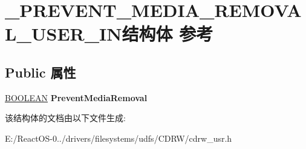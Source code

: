 \hypertarget{struct___p_r_e_v_e_n_t___m_e_d_i_a___r_e_m_o_v_a_l___u_s_e_r___i_n}{}\section{\+\_\+\+P\+R\+E\+V\+E\+N\+T\+\_\+\+M\+E\+D\+I\+A\+\_\+\+R\+E\+M\+O\+V\+A\+L\+\_\+\+U\+S\+E\+R\+\_\+\+I\+N结构体 参考}
\label{struct___p_r_e_v_e_n_t___m_e_d_i_a___r_e_m_o_v_a_l___u_s_e_r___i_n}
\subsection*{Public 属性}
\begin{DoxyCompactItemize}
\item 
\mbox{\label{struct___p_r_e_v_e_n_t___m_e_d_i_a___r_e_m_o_v_a_l___u_s_e_r___i_n_ad6d98dcdcebd6589b00c32a1b9b58669}} 
\hyperlink{_processor_bind_8h_a112e3146cb38b6ee95e64d85842e380a}{B\+O\+O\+L\+E\+AN} {\bfseries Prevent\+Media\+Removal}
\end{DoxyCompactItemize}


该结构体的文档由以下文件生成\+:\begin{DoxyCompactItemize}
\item 
E\+:/\+React\+O\+S-\/0../drivers/filesystems/udfs/\+C\+D\+R\+W/cdrw\+\_\+usr.\+h\end{DoxyCompactItemize}
